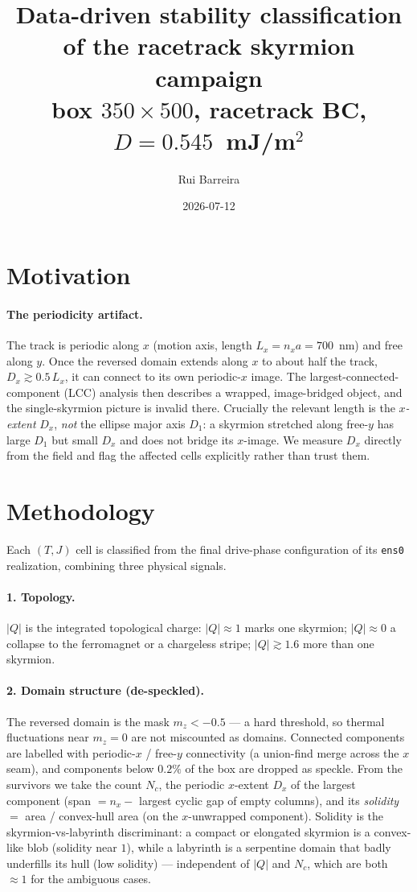 \documentclass[11pt]{article}
\title{Data-driven stability classification of the racetrack
skyrmion campaign\\[2pt]
\large box $350\times500$, racetrack BC, $D=0.545$~mJ/m$^2$}
\author{Rui Barreira}
\date{2026-07-12}
\newcommand{\Q}{\lvert Q\rvert}
\begin{document}
\maketitle

\section{Motivation}
\paragraph{The periodicity artifact.}
The track is periodic along $x$ (motion axis, length $L_x=n_x a=700$~nm)
and free along $y$. Once the reversed domain extends along $x$ to about
half the track, $D_x\gtrsim0.5\,L_x$, it can connect to its own
periodic-$x$ image. The largest-connected-component (LCC) analysis then
describes a wrapped, image-bridged object, and the single-skyrmion
picture is invalid there. Crucially the relevant length is the
\emph{$x$-extent} $D_x$, \emph{not} the ellipse major axis $D_1$: a
skyrmion stretched along free-$y$ has large $D_1$ but small $D_x$ and
does not bridge its $x$-image. We measure $D_x$ directly from the field
and flag the affected cells explicitly rather than trust them.

\section{Methodology}
Each $(T,J)$ cell is classified from the final drive-phase
configuration of its \texttt{ens0} realization, combining three
physical signals.

\paragraph{1. Topology.}
$\Q$ is the integrated topological charge: $\Q\approx1$ marks one
skyrmion; $\Q\approx0$ a collapse to the ferromagnet or a chargeless
stripe; $\Q\gtrsim1.6$ more than one skyrmion.

\paragraph{2. Domain structure (de-speckled).}
The reversed domain is the mask $m_z<-0.5$ --- a hard threshold, so
thermal fluctuations near $m_z=0$ are not miscounted as domains.
Connected components are labelled with periodic-$x$ / free-$y$
connectivity (a union-find merge across the $x$ seam), and components
below $0.2\%$ of the box are dropped as speckle. From the survivors we
take the count $N_c$, the periodic $x$-extent $D_x$ of the largest
component (span $=n_x-$ largest cyclic gap of empty columns), and its
\emph{solidity} $=$ area / convex-hull area (on the $x$-unwrapped
component). Solidity is the skyrmion-vs-labyrinth discriminant: a
compact or elongated skyrmion is a convex-like blob (solidity near $1$),
while a labyrinth is a serpentine domain that badly underfills its hull
(low solidity) --- independent of $\Q$ and $N_c$, which are both
$\approx1$ for the ambiguous cases.
\end{document}
